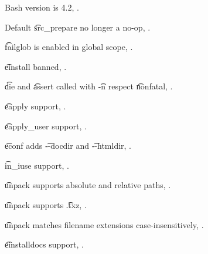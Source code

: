 \begin{compactitem}
\item Bash version is 4.2, .
\item Default \t{src\_prepare} no longer a no-op, .
\item \t{failglob} is enabled in global scope, .
\item \t{einstall} banned, .
\item \t{die} and \t{assert} called with \t{-n} respect \t{nonfatal}, .
\item \t{eapply} support, .
\item \t{eapply\_user} support, .
\item \t{econf} adds \t{-{}-docdir} and \t{-{}-htmldir}, .
\item \t{in\_iuse} support, .
\item \t{unpack} supports absolute and relative paths, .
\item \t{unpack} supports \t{.txz}, .
\item \t{unpack} matches filename extensions case-insensitively, .
\item \t{einstalldocs} support, .
\end{compactitem}



